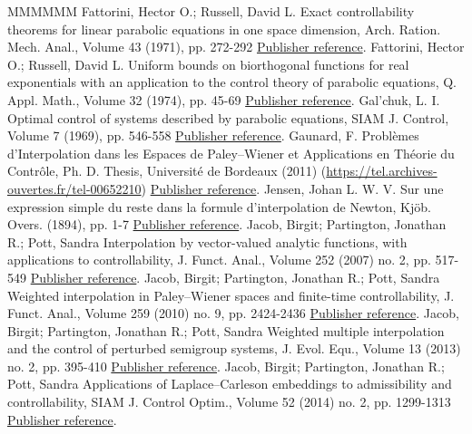 \documentclass[11pt]{article}
\theoremstyle{definition}
\numberwithin{equation}{section}
\numberwithin{figure}{section}
\numberwithin{table}{section}
\begin{document}
\begin{thebibliography}{MMMMMM}
 Fattorini, Hector O.; Russell, David L. Exact controllability theorems for linear parabolic equations in one space dimension, Arch. Ration. Mech. Anal., Volume 43 (1971), pp. 272-292 \href{https://ahl.centre-mersenne.org/item/AHL_2020__3__717_0/#FattoriniRussell71}{Publisher reference}.
 Fattorini, Hector O.; Russell, David L. Uniform bounds on biorthogonal functions for real exponentials with an application to the control theory of parabolic equations, Q. Appl. Math., Volume 32 (1974), pp. 45-69 \href{https://ahl.centre-mersenne.org/item/AHL_2020__3__717_0/#FattoriniRussell74}{Publisher reference}.
 Gal’chuk, L. I. Optimal control of systems described by parabolic equations, SIAM J. Control, Volume 7 (1969), pp. 546-558 \href{https://ahl.centre-mersenne.org/item/AHL_2020__3__717_0/#Galchuk69}{Publisher reference}.
 Gaunard, F. Problèmes d’Interpolation dans les Espaces de Paley–Wiener et Applications en Théorie du Contrôle, Ph. D. Thesis, Université de Bordeaux (2011) (\url{https://tel.archives-ouvertes.fr/tel-00652210}) \href{https://ahl.centre-mersenne.org/item/AHL_2020__3__717_0/#TheseGaunard}{Publisher reference}.
 Jensen, Johan L. W. V. Sur une expression simple du reste dans la formule d’interpolation de Newton, Kjöb. Overs. (1894), pp. 1-7 \href{https://ahl.centre-mersenne.org/item/AHL_2020__3__717_0/#Jensen_1894}{Publisher reference}.
 Jacob, Birgit; Partington, Jonathan R.; Pott, Sandra Interpolation by vector-valued analytic functions, with applications to controllability, J. Funct. Anal., Volume 252 (2007) no. 2, pp. 517-549 \href{https://ahl.centre-mersenne.org/item/AHL_2020__3__717_0/#JacobPartingtonPott2007}{Publisher reference}.
 Jacob, Birgit; Partington, Jonathan R.; Pott, Sandra Weighted interpolation in Paley–Wiener spaces and finite-time controllability, J. Funct. Anal., Volume 259 (2010) no. 9, pp. 2424-2436 \href{https://ahl.centre-mersenne.org/item/AHL_2020__3__717_0/#JacobPartingtonPott2010}{Publisher reference}.
 Jacob, Birgit; Partington, Jonathan R.; Pott, Sandra Weighted multiple interpolation and the control of perturbed semigroup systems, J. Evol. Equ., Volume 13 (2013) no. 2, pp. 395-410 \href{https://ahl.centre-mersenne.org/item/AHL_2020__3__717_0/#JacobPartingtonPott2013}{Publisher reference}.
 Jacob, Birgit; Partington, Jonathan R.; Pott, Sandra Applications of Laplace–Carleson embeddings to admissibility and controllability, SIAM J. Control Optim., Volume 52 (2014) no. 2, pp. 1299-1313 \href{https://ahl.centre-mersenne.org/item/AHL_2020__3__717_0/#JacobPartingtonPott2014}{Publisher reference}.

\end{thebibliography}
\end{document}

